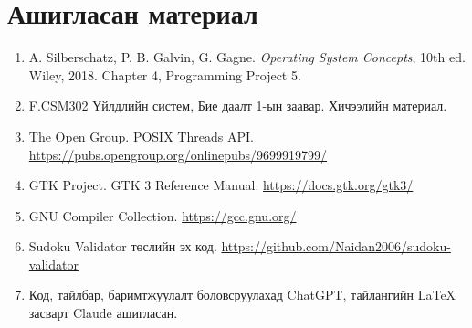 \documentclass[12pt,a4paper]{report}
\newcommand{\repo}{\url{https://github.com/Naidan2006/sudoku-validator}}
\begin{document}
\chapter*{Ашигласан материал}
\begin{enumerate}
	\item A. Silberschatz, P. B. Galvin, G. Gagne. \textit{Operating System Concepts}, 10th ed. Wiley, 2018. Chapter 4, Programming Project 5.
	\item F.CSM302 Үйлдлийн систем, Бие даалт 1-ын заавар. Хичээлийн материал.
	\item The Open Group. POSIX Threads API. \url{https://pubs.opengroup.org/onlinepubs/9699919799/}
	\item GTK Project. GTK 3 Reference Manual. \url{https://docs.gtk.org/gtk3/}
	\item GNU Compiler Collection. \url{https://gcc.gnu.org/}
	\item Sudoku Validator төслийн эх код. \repo
	\item Код, тайлбар, баримтжуулалт боловсруулахад ChatGPT, тайлангийн LaTeX засварт Claude ашигласан.
\end{enumerate}
\appendix
\end{document}
